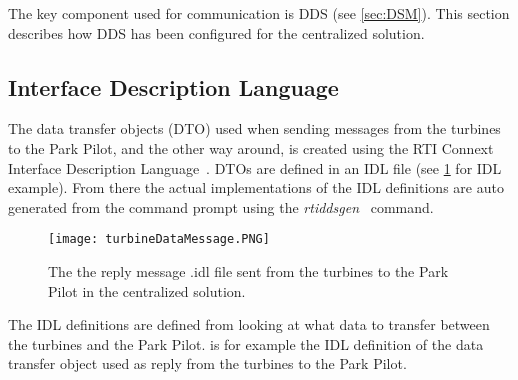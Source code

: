 The key component used for communication is DDS (see \cref{sec:DSM}). This section describes how DDS has been configured for the centralized solution.

\subsection{Interface Description Language}\label{sec:cenIdl}

The data transfer objects (DTO) used when sending messages from the turbines to the Park Pilot, and the other way around, is created using the RTI Connext Interface Description Language~\cite{rtiConnextUsersManual}. DTOs are defined in an IDL file (see \cref{fig:cenTurbineDataMessage} for IDL example). From there the actual implementations of the IDL definitions are auto generated from the command prompt using the \textit{rtiddsgen}~\cite{rtiConnextUsersManual} command.

\begin{figure}[!h]
	\centering
	\texttt{[image: turbineDataMessage.PNG]} 
	\caption[Centralized turbine reply message]{
		\label{fig:cenTurbineDataMessage} 
		\footnotesize{%
			The the reply message .idl file sent from the turbines to the Park Pilot in the centralized solution.
		}
	}
\end{figure}

The IDL definitions are defined from looking at what data to transfer between the turbines and the Park Pilot.  is for example the IDL definition of the data transfer object used as reply from the turbines to the Park Pilot.

%
%
%	
%

